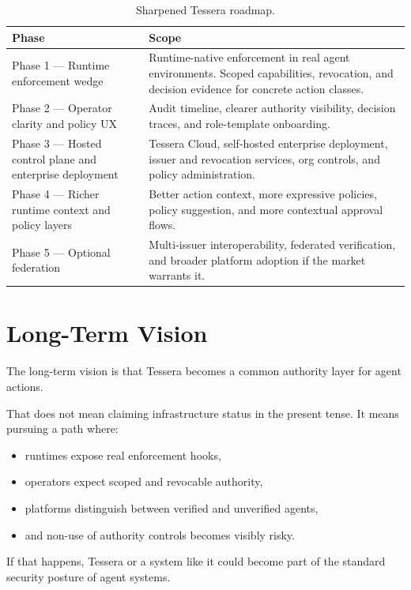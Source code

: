\documentclass[11pt, a4paper]{article}
\begin{document}
\begin{table}[H]
\centering
\small
\begin{tabularx}{\textwidth}{@{}lX@{}}
\toprule
\textbf{Phase} & \textbf{Scope} \\
\midrule
Phase 1 --- Runtime enforcement wedge & Runtime-native enforcement in real agent environments. Scoped capabilities, revocation, and decision evidence for concrete action classes. \\
Phase 2 --- Operator clarity and policy UX & Audit timeline, clearer authority visibility, decision traces, and role-template onboarding. \\
Phase 3 --- Hosted control plane and enterprise deployment & Tessera Cloud, self-hosted enterprise deployment, issuer and revocation services, org controls, and policy administration. \\
Phase 4 --- Richer runtime context and policy layers & Better action context, more expressive policies, policy suggestion, and more contextual approval flows. \\
Phase 5 --- Optional federation & Multi-issuer interoperability, federated verification, and broader platform adoption if the market warrants it. \\
\bottomrule
\end{tabularx}
\caption{Sharpened Tessera roadmap.}
\end{table}

\section{Long-Term Vision}

The long-term vision is that Tessera becomes a common authority layer for agent actions.

That does not mean claiming infrastructure status in the present tense. It means pursuing a path where:

\begin{itemize}
  \item runtimes expose real enforcement hooks,
  \item operators expect scoped and revocable authority,
  \item platforms distinguish between verified and unverified agents,
  \item and non-use of authority controls becomes visibly risky.
\end{itemize}

If that happens, Tessera or a system like it could become part of the standard security posture of agent systems.
\end{document}
